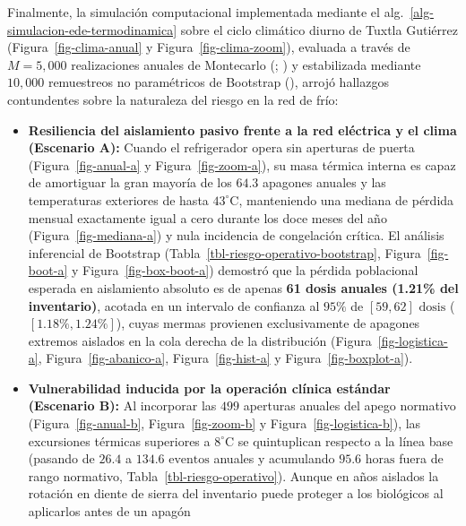 \documentclass[
  spanish,
  letterpaper,
  DIV=11,
  numbers=noendperiod]{scrreprt}
\providecommand{\tightlist}{%
  \setlength{\itemsep}{0pt}\setlength{\parskip}{0pt}}
\theoremstyle{plain}
\theoremstyle{plain}
\theoremstyle{plain}
\theoremstyle{definition}
\theoremstyle{remark}
\begin{document}
Finalmente, la simulación computacional implementada mediante el
alg.~\ref{alg-simulacion-ede-termodinamica} sobre el ciclo climático
diurno de Tuxtla Gutiérrez (Figura~\ref{fig-clima-anual} y
Figura~\ref{fig-clima-zoom}), evaluada a través de \(M = 5,000\)
realizaciones anuales de Montecarlo
(;
) y estabilizada mediante
\(10,000\) remuestreos no paramétricos de Bootstrap
(), arrojó
hallazgos contundentes sobre la naturaleza del riesgo en la red de frío:

\begin{itemize}
\tightlist
\item
  \textbf{Resiliencia del aislamiento pasivo frente a la red eléctrica y
  el clima (Escenario A):} Cuando el refrigerador opera sin aperturas de
  puerta (Figura~\ref{fig-anual-a} y Figura~\ref{fig-zoom-a}), su masa
  térmica interna es capaz de amortiguar la gran mayoría de los \(64.3\)
  apagones anuales y las temperaturas exteriores de hasta
  \(43^\circ\text{C}\), manteniendo una mediana de pérdida mensual
  exactamente igual a cero durante los doce meses del año
  (Figura~\ref{fig-mediana-a}) y nula incidencia de congelación crítica.
  El análisis inferencial de Bootstrap
  (Tabla~\ref{tbl-riesgo-operativo-bootstrap}, Figura~\ref{fig-boot-a} y
  Figura~\ref{fig-box-boot-a}) demostró que la pérdida poblacional
  esperada en aislamiento absoluto es de apenas \textbf{61 dosis anuales
  (1.21\% del inventario)}, acotada en un intervalo de confianza al
  \(95\%\) de \([59, 62]\text{ dosis}\) (\([1.18\%, 1.24\%]\)), cuyas
  mermas provienen exclusivamente de apagones extremos aislados en la
  cola derecha de la distribución (Figura~\ref{fig-logistica-a},
  Figura~\ref{fig-abanico-a}, Figura~\ref{fig-hist-a} y
  Figura~\ref{fig-boxplot-a}).
\item
  \textbf{Vulnerabilidad inducida por la operación clínica estándar
  (Escenario B):} Al incorporar las \(499\) aperturas anuales del apego
  normativo (Figura~\ref{fig-anual-b}, Figura~\ref{fig-zoom-b} y
  Figura~\ref{fig-logistica-b}), las excursiones térmicas superiores a
  \(8^\circ\text{C}\) se quintuplican respecto a la línea base (pasando
  de \(26.4\) a \(134.6\text{ eventos}\) anuales y acumulando
  \(95.6\text{ horas}\) fuera de rango normativo,
  Tabla~\ref{tbl-riesgo-operativo}). Aunque en años aislados la rotación
  en diente de sierra del inventario puede proteger a los biológicos al
  aplicarlos antes de un apagón

\end{itemize}
\end{document}

